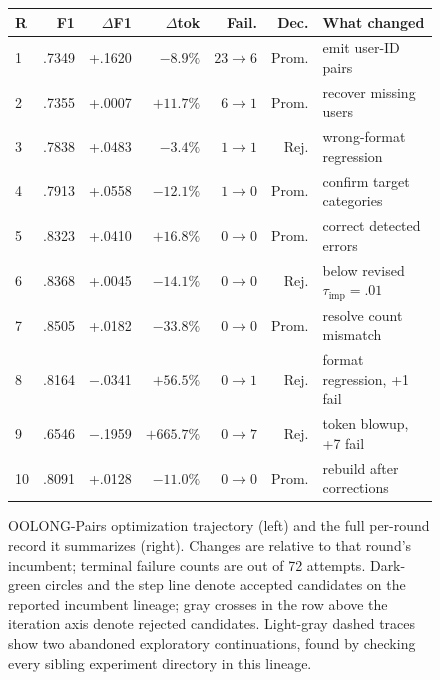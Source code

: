 \begin{figure}[t]
\begin{minipage}{.46\linewidth}
\end{minipage}%
\hfill
\begin{minipage}{.52\linewidth}
\centering\scriptsize
\setlength{\tabcolsep}{2.2pt}
\renewcommand{\arraystretch}{1.05}
\begin{tabularx}{\linewidth}{@{}lrrrrrX@{}}
\toprule
R & F1 & $\Delta$F1 & $\Delta$tok & Fail. & Dec. & What changed \\
\midrule
1  & .7349 & +.1620 & $-8.9\%$   & $23\to6$ & Prom. & emit user-ID pairs \\
2  & .7355 & +.0007 & $+11.7\%$  & $6\to1$  & Prom. & recover missing users \\
3  & .7838 & +.0483 & $-3.4\%$   & $1\to1$  & Rej.  & wrong-format regression \\
4  & .7913 & +.0558 & $-12.1\%$  & $1\to0$  & Prom. & confirm target categories \\
5  & .8323 & +.0410 & $+16.8\%$  & $0\to0$  & Prom. & correct detected errors \\
6  & .8368 & +.0045 & $-14.1\%$  & $0\to0$  & Rej.  & below revised $\tau_{\mathrm{imp}}=.01$ \\
7  & .8505 & +.0182 & $-33.8\%$  & $0\to0$  & Prom. & resolve count mismatch \\
8  & .8164 & $-$.0341 & $+56.5\%$  & $0\to1$  & Rej.  & format regression, +1 fail \\
9  & .6546 & $-$.1959 & $+665.7\%$ & $0\to7$  & Rej.  & token blowup, +7 fail \\
10 & .8091 & +.0128 & $-11.0\%$  & $0\to0$  & Prom. & rebuild after corrections \\
\bottomrule
\end{tabularx}
\end{minipage}
\caption{OOLONG-Pairs optimization trajectory (left) and the full per-round
record it summarizes (right). Changes are relative to that round's incumbent;
terminal failure counts are out of 72 attempts. Dark-green circles and the
step line denote accepted candidates on the reported incumbent lineage; gray
crosses in the row above the iteration axis denote rejected candidates.
Light-gray dashed traces show two abandoned exploratory continuations, found
by checking every sibling experiment directory in this lineage.}
\label{fig:optimization-trajectory}
\end{figure}

